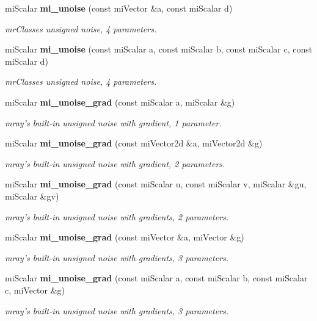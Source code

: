 \begin{CompactItemize}
mi\-Scalar {\bf mi\_\-unoise} (const mi\-Vector \&a, const mi\-Scalar d)
\begin{CompactList}\small\item\em mr\-Classes unsigned noise, 4 parameters. \item\end{CompactList}\item 
mi\-Scalar {\bf mi\_\-unoise} (const mi\-Scalar a, const mi\-Scalar b, const mi\-Scalar c, const mi\-Scalar d)
\begin{CompactList}\small\item\em mr\-Classes unsigned noise, 4 parameters. \item\end{CompactList}\item 
mi\-Scalar {\bf mi\_\-unoise\_\-grad} (const mi\-Scalar a, mi\-Scalar \&g)
\begin{CompactList}\small\item\em mray's built-in unsigned noise with gradient, 1 parameter. \item\end{CompactList}\item 
mi\-Scalar {\bf mi\_\-unoise\_\-grad} (const mi\-Vector2d \&a, mi\-Vector2d \&g)
\begin{CompactList}\small\item\em mray's built-in unsigned noise with gradient, 2 parameters. \item\end{CompactList}\item 
mi\-Scalar {\bf mi\_\-unoise\_\-grad} (const mi\-Scalar u, const mi\-Scalar v, mi\-Scalar \&gu, mi\-Scalar \&gv)
\begin{CompactList}\small\item\em mray's built-in unsigned noise with gradients, 2 parameters. \item\end{CompactList}\item 
mi\-Scalar {\bf mi\_\-unoise\_\-grad} (const mi\-Vector \&a, mi\-Vector \&g)
\begin{CompactList}\small\item\em mray's built-in unsigned noise with gradients, 3 parameters. \item\end{CompactList}\item 
mi\-Scalar {\bf mi\_\-unoise\_\-grad} (const mi\-Scalar a, const mi\-Scalar b, const mi\-Scalar c, mi\-Vector \&g)
\begin{CompactList}\small\item\em mray's built-in unsigned noise with gradients, 3 parameters. \item\end{CompactList}\item 

\end{CompactItemize}
